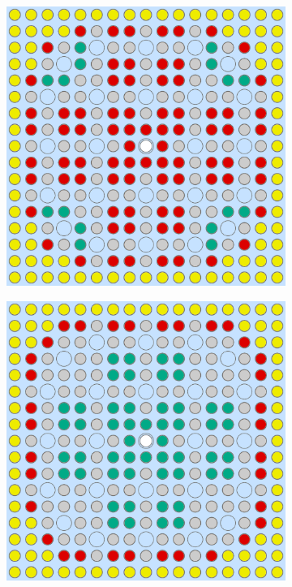 \begin{figure}[h!]
\begin{subfigure}{0.47\textwidth}
  \caption{}
  \label{fig:chap10-assm-16-combined-2}
\end{subfigure}
\begin{subfigure}{0.47\textwidth}
  \centering
  \includegraphics[width=0.9\linewidth]{figures/unsupervised/geometries/with-features/4-clusters/pinch/assm-16}
  \caption{}
  \label{fig:chap10-assm-16-pinch-4}
\end{subfigure}%
\begin{subfigure}{0.47\textwidth}
  \centering
  \includegraphics[width=0.9\linewidth]{figures/unsupervised/geometries/with-features/4-clusters/combined/assm-16}

\end{subfigure}
\end{figure}
